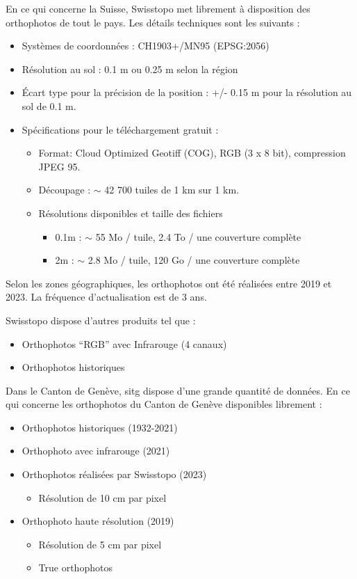 En ce qui concerne la Suisse, Swisstopo \cite{swisstopo_swissimage_nodate} met librement à disposition des orthophotos de tout le pays. Les détails techniques sont les suivants :
\begin{itemize}
    \item Systèmes de coordonnées : CH1903+/MN95 (EPSG:2056)
    \item Résolution au sol : 0.1 m ou 0.25 m selon la région
    \item Écart type pour la précision de la position : +/- 0.15 m pour la résolution au sol de 0.1 m.
    \item Spécifications pour le téléchargement gratuit :
    \begin{itemize}
        \item Format: Cloud Optimized Geotiff (COG), RGB (3 x 8 bit), compression JPEG 95.
        \item Découpage : $\sim$ 42 700 tuiles de 1 km sur 1 km.
        \item Résolutions disponibles et taille des fichiers
        \begin{itemize}
            \item 0.1m : $\sim$ 55 Mo / tuile, 2.4 To / une couverture complète
            \item 2m : $\sim$ 2.8 Mo / tuile, 120 Go / une couverture complète
        \end{itemize}
    \end{itemize}
\end{itemize}

Selon les zones géographiques, les orthophotos ont été réalisées entre 2019 et 2023. La fréquence d'actualisation est de 3 ans.

Swisstopo dispose d'autres produits tel que :
\begin{itemize}
    \item Orthophotos ``RGB'' avec Infrarouge (4 canaux)
    \item Orthophotos historiques
\end{itemize}

Dans le Canton de Genève, \acrshort{sitg} \cite{sitg_chiffre-cle_2025} dispose d'une grande quantité de données. En ce qui concerne les orthophotos du Canton de Genève disponibles librement :
\begin{itemize}
    \item Orthophotos historiques (1932-2021)
    \item Orthophoto avec infrarouge (2021)
    \item Orthophotos réalisées par Swisstopo (2023)
    \begin{itemize}
        \item Résolution de 10 cm par pixel
    \end{itemize}
    \item Orthophoto haute résolution (2019)
    \begin{itemize}
        \item Résolution de 5 cm par pixel
        \item True orthophotos
    \end{itemize}
\end{itemize}

